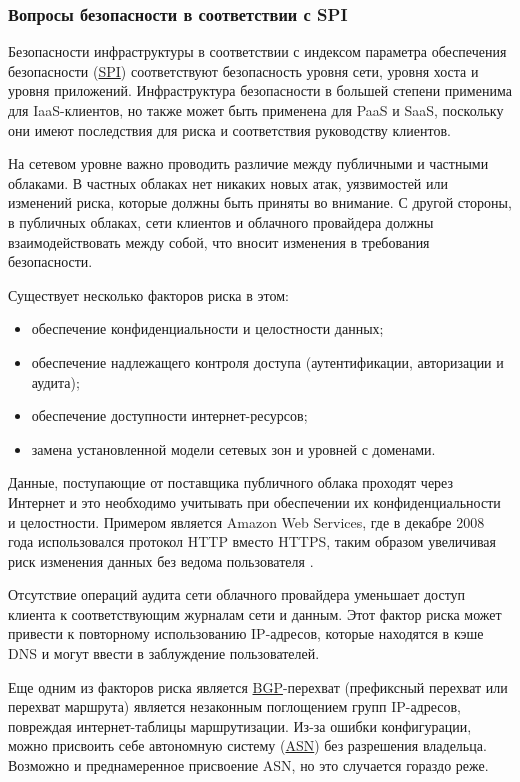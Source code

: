 \subsubsection{Вопросы безопасности в соответствии с SPI}

Безопасности инфраструктуры в соответствии с индексом параметра обеспечения безопасности (\hyperlink{spi}{SPI}) соответствуют безопасность уровня сети, уровня хоста и уровня приложений.
Инфраструктура безопасности в большей степени применима для IaaS-клиентов, но также может быть применена для PaaS и SaaS, поскольку они имеют последствия для риска и соответствия руководству клиентов.

На сетевом уровне важно проводить различие между публичными и частными облаками.
В частных облаках нет никаких новых атак, уязвимостей или изменений риска, которые должны быть приняты во внимание.
С другой стороны, в публичных облаках, сети клиентов и облачного провайдера должны взаимодействовать между собой, что вносит изменения в требования безопасности.

Существует несколько факторов риска в этом:
\begin{itemize}
  \item обеспечение конфиденциальности и целостности данных;
  \item обеспечение надлежащего контроля доступа (аутентификации, авторизации и аудита);
  \item обеспечение доступности интернет-ресурсов;
  \item замена установленной модели сетевых зон и уровней с доменами.
\end{itemize}

Данные, поступающие от поставщика публичного облака проходят через Интернет и это необходимо учитывать при обеспечении их конфиденциальности и целостности.
Примером является Amazon Web Services, где в декабре 2008 года использовался протокол HTTP вместо HTTPS, таким образом увеличивая риск изменения данных без ведома пользователя \cite{aws}.

Отсутствие операций аудита сети облачного провайдера уменьшает доступ клиента к соответствующим журналам сети и данным.
Этот фактор риска может привести к повторному использованию IP-адресов, которые находятся в кэше DNS и могут ввести в заблуждение пользователей.

Еще одним из факторов риска является \hyperlink{bgp}{BGP}-перехват (префиксный перехват или перехват маршрута) является незаконным поглощением групп IP-адресов, повреждая интернет-таблицы маршрутизации.
Из-за ошибки конфигурации, можно присвоить себе автономную систему (\hyperlink{asn}{ASN}) без разрешения владельца.
Возможно и преднамеренное присвоение ASN, но это случается гораздо реже.

